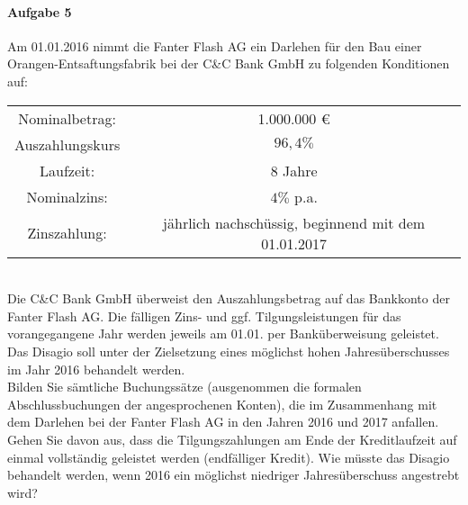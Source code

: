\documentclass[paper=a4, fontsize=11pt]{scrartcl}
\numberwithin{equation}{section}
\numberwithin{figure}{section}
\numberwithin{table}{section}
\begin{document}
\paragraph{Aufgabe 5}
Am 01.01.2016 nimmt die Fanter Flash AG ein Darlehen für den Bau einer Orangen-Entsaftungsfabrik bei der C\&C Bank GmbH zu folgenden Konditionen auf:  \\
\begin{tabular}{cc}
Nominalbetrag: & 1.000.000 € \\
Auszahlungskurs & $96,4 \%$ \\
Laufzeit: & 8 Jahre \\
Nominalzins: & $4 \%$ p.a. \\
Zinszahlung: & jährlich nachschüssig, beginnend mit dem 01.01.2017
\end{tabular} \\
Die C\&C Bank GmbH überweist den Auszahlungsbetrag auf das Bankkonto der Fanter Flash AG. Die fälligen Zins- und ggf. Tilgungsleistungen für das vorangegangene Jahr werden jeweils am 01.01. per Banküberweisung geleistet. Das Disagio soll unter der Zielsetzung eines möglichst hohen Jahresüberschusses im Jahr 2016 behandelt werden.  \\
Bilden Sie sämtliche Buchungssätze (ausgenommen die formalen Abschlussbuchungen der angesprochenen Konten), die im Zusammenhang mit dem Darlehen bei der Fanter Flash AG in den Jahren 2016 und 2017 anfallen. Gehen Sie davon aus, dass die Tilgungszahlungen am Ende der Kreditlaufzeit auf einmal vollständig geleistet werden (endfälliger Kredit). Wie müsste das Disagio behandelt werden, wenn 2016 ein möglichst niedriger Jahresüberschuss angestrebt wird? \\
\end{document}
